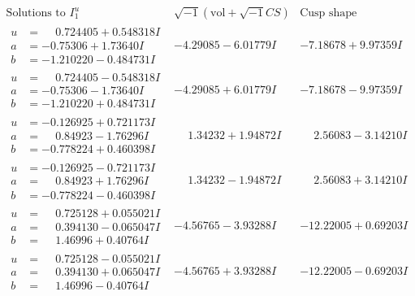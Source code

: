 \documentclass[1p]{elsarticle_modified}
\theoremstyle{definition}
\newcommand{\I}{\sqrt{-1}}
\begin{document}
$$\begin{array}{c|c|c}  
\text{Solutions to }I^u_{1}& \I (\text{vol} + \sqrt{-1}CS) & \text{Cusp shape}\\
 \hline 
\begin{aligned}
u &= \phantom{-}0.724405 + 0.548318 I \\
a &= -0.75306 + 1.73640 I \\
b &= -1.210220 - 0.484731 I\end{aligned}
 & -4.29085 - 6.01779 I & -7.18678 + 9.97359 I \\ \hline\begin{aligned}
u &= \phantom{-}0.724405 - 0.548318 I \\
a &= -0.75306 - 1.73640 I \\
b &= -1.210220 + 0.484731 I\end{aligned}
 & -4.29085 + 6.01779 I & -7.18678 - 9.97359 I \\ \hline\begin{aligned}
u &= -0.126925 + 0.721173 I \\
a &= \phantom{-}0.84923 - 1.76296 I \\
b &= -0.778224 + 0.460398 I\end{aligned}
 & \phantom{-}1.34232 + 1.94872 I & \phantom{-}2.56083 - 3.14210 I \\ \hline\begin{aligned}
u &= -0.126925 - 0.721173 I \\
a &= \phantom{-}0.84923 + 1.76296 I \\
b &= -0.778224 - 0.460398 I\end{aligned}
 & \phantom{-}1.34232 - 1.94872 I & \phantom{-}2.56083 + 3.14210 I \\ \hline\begin{aligned}
u &= \phantom{-}0.725128 + 0.055021 I \\
a &= \phantom{-}0.394130 - 0.065047 I \\
b &= \phantom{-}1.46996 + 0.40764 I\end{aligned}
 & -4.56765 - 3.93288 I & -12.22005 + 0.69203 I \\ \hline\begin{aligned}
u &= \phantom{-}0.725128 - 0.055021 I \\
a &= \phantom{-}0.394130 + 0.065047 I \\
b &= \phantom{-}1.46996 - 0.40764 I\end{aligned}
 & -4.56765 + 3.93288 I & -12.22005 - 0.69203 I \\ \hline\begin{aligned}

\end{aligned}
\end{array}$$
\end{document}
